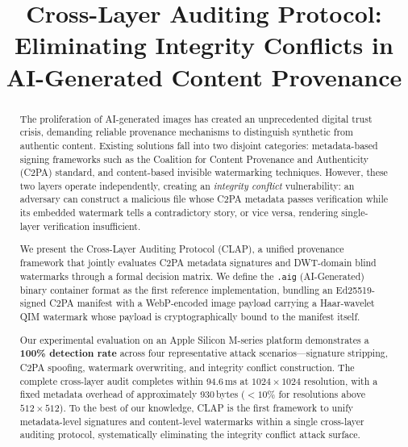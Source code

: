 \documentclass[conference]{IEEEtran}
\begin{document}
\title{Cross-Layer Auditing Protocol: Eliminating Integrity Conflicts
       in AI-Generated Content Provenance}

\author{
}

\maketitle

\begin{abstract}
The proliferation of AI-generated images has created an unprecedented
digital trust crisis, demanding reliable provenance mechanisms to
distinguish synthetic from authentic content.
Existing solutions fall into two disjoint categories: metadata-based
signing frameworks such as the Coalition for Content Provenance and
Authenticity (C2PA) standard, and content-based invisible watermarking
techniques.
However, these two layers operate independently, creating an
\textit{integrity conflict} vulnerability: an adversary can construct a
malicious file whose C2PA metadata passes verification while its embedded
watermark tells a contradictory story, or vice versa, rendering single-layer
verification insufficient.

We present the Cross-Layer Auditing Protocol (CLAP), a unified provenance
framework that jointly evaluates C2PA metadata signatures and DWT-domain
blind watermarks through a formal decision matrix.
We define the \texttt{.aig} (AI-Generated) binary container format as the
first reference implementation, bundling an Ed25519-signed C2PA manifest
with a WebP-encoded image payload carrying a Haar-wavelet QIM watermark
whose payload is cryptographically bound to the manifest itself.

Our experimental evaluation on an Apple Silicon M-series platform
demonstrates a \textbf{100\% detection rate} across four representative
attack scenarios—signature stripping, C2PA spoofing, watermark overwriting,
and integrity conflict construction.
The complete cross-layer audit completes within 94.6\,ms at
$1024{\times}1024$ resolution, with a fixed metadata overhead of
approximately 930\,bytes (${<}10\%$ for resolutions above
$512{\times}512$).
To the best of our knowledge, CLAP is the first framework to unify
metadata-level signatures and content-level watermarks within a single
cross-layer auditing protocol, systematically eliminating the integrity
conflict attack surface.
\end{abstract}
\end{document}
